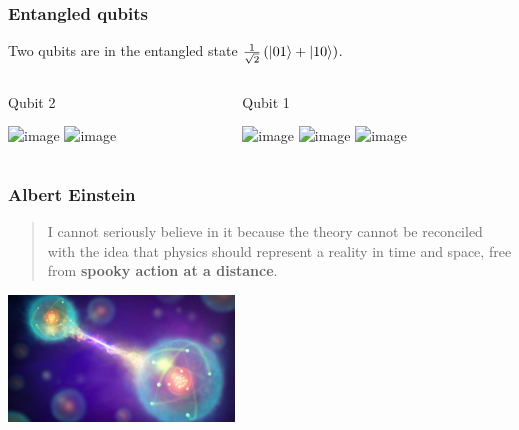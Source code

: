 \documentclass[10pt]{beamer}
\begin{document}
\begin{frame}
  \frametitle{Entangled qubits}
  \centering
      Two qubits are in the entangled state $\frac{1}{\sqrt{2}}\left( \ket{01} + \ket{10} \right)$.
  \begin{columns}
    \begin{column}{0.5\linewidth}
      \begin{center}
        Qubit 2

        \includegraphics<1-2>[height=3cm]{img/euro-spinning.png}
        \includegraphics<3->[height=3cm]{img/euro-1.jpg}
        \end{center}
    \end{column}
    \begin{column}{0.5\linewidth}
      \begin{center}
        Qubit 1

        \includegraphics<1>[height=3cm]{img/euro-spinning.png}
        \includegraphics<2>[height=3cm]{img/coin-measure.png}
        \includegraphics<3->[height=3cm]{img/euro-0.jpg}
        \end{center}
    \end{column}
  \end{columns}
\end{frame}
\begin{frame}
  \frametitle{Albert Einstein}
    \centering
  \begin{quote}
    I cannot seriously believe in it because the theory cannot be reconciled with the idea that physics should represent a reality in time and space, free from \textbf{spooky action at a distance}.
    \end{quote}
    \includegraphics[width=6cm]{img/entanglement.jpg}
\end{frame}
\end{document}
